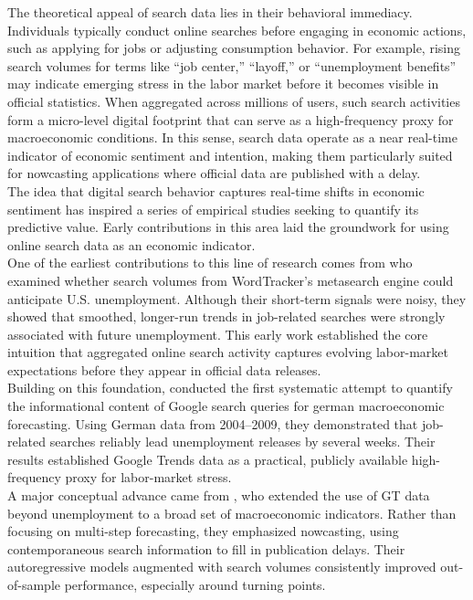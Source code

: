 \documentclass[12pt,a4paper]{article}
\begin{document}
The theoretical appeal of search data lies in their behavioral immediacy. Individuals typically conduct online searches before engaging in economic actions, such as applying for jobs or adjusting consumption behavior.
For example, rising search volumes for terms like “job center,” “layoff,” or “unemployment benefits” may indicate emerging stress in the labor market before it becomes visible in official statistics.
When aggregated across millions of users, such search activities form a micro-level digital footprint that can serve as a high-frequency proxy for macroeconomic conditions. In this sense, search data operate as a near real-time indicator of economic sentiment and intention, making them particularly suited for nowcasting applications where official data are published with a delay.
\\
The idea that digital search behavior captures real-time shifts in economic sentiment has inspired a series of empirical studies seeking to quantify its predictive value. Early contributions in this area laid the groundwork for using online search data as an economic indicator.\\
One of the earliest contributions to this line of research comes from \citet{ettrege} who examined whether search volumes from WordTracker’s metasearch engine could anticipate U.S. unemployment. Although their short-term signals were noisy, they showed that smoothed, longer-run trends in job-related searches were strongly associated with future unemployment. This early work established the core intuition that aggregated online search activity captures evolving labor-market expectations before they appear in official data releases.\\
Building on this foundation, \citet{Askitas} conducted the first systematic attempt to quantify the informational content of Google search queries for german macroeconomic forecasting. Using German data from 2004–2009, they demonstrated that job-related searches reliably lead unemployment releases by several weeks. Their results established Google Trends data as a practical, publicly available high-frequency proxy for labor-market stress.\\
A major conceptual advance came from \citet{varian}, who extended the use of GT data beyond unemployment to a broad set of macroeconomic indicators. Rather than focusing on multi-step forecasting, they emphasized nowcasting, using contemporaneous search information to fill in publication delays. Their autoregressive models augmented with search volumes consistently improved out-of-sample performance, especially around turning points.\\
\end{document}
